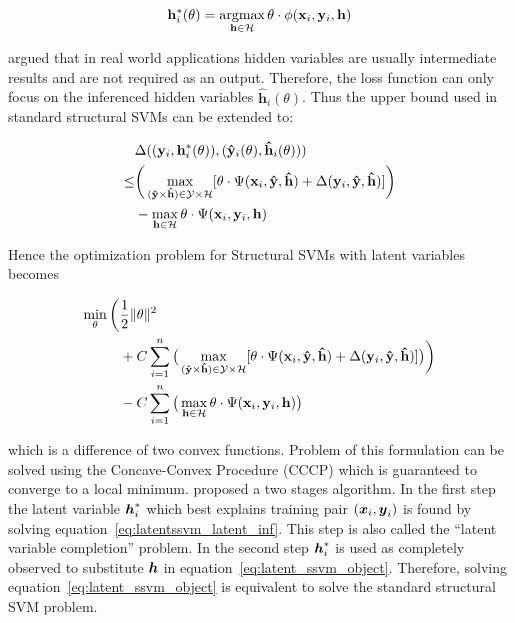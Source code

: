 \documentclass[sigconf, anonymous, review]{acmart}
\renewcommand{\citename}{\citet}
\renewcommand{\cite}{\citep}
\begin{document}
\begin{align}
  \label{eq:latentssvm_latent_inf}
  \mathbf{h}^*_i(\theta) = \mathop{\textrm{argmax}}_{\mathbf{h} \in \mathcal{H}} \theta \cdot
  \phi(\mathbf{x}_i,\mathbf{y}_i,\mathbf{h})
\end{align}

\citename{yu2009learning} argued that in real world applications
hidden variables are usually intermediate results and are not
required as an output\cite{yu2009learning}. Therefore, the loss
function can only focus on the inferenced hidden variables
$\mathbf{\hat{h}}_i(\theta)$. Thus the upper bound used in
standard structural SVMs\cite{tsochantaridis2005large} can be
extended to:

\begin{align}
  &\Delta((\mathbf{y}_i,\mathbf{h}^*_i(\theta)),(\mathbf{\hat{y}}_i(\theta),\mathbf{\hat{h}}_i(\theta)))\notag\\
  \leq&
    \bigg(\max_{(\mathbf{\hat{y}} \times \mathbf{\hat{h}}) \in
    \mathcal{Y} \times \mathcal{H}}
    [\theta\cdot\Psi(\mathbf{x}_i,\mathbf{\hat{y}},\mathbf{\hat{h}})
  +\Delta(\mathbf{y}_i,\mathbf{\hat{y}},\mathbf{\hat{h}})]\bigg)\notag\\
  &-\max_{\mathbf{h} \in \mathcal{H}} \theta \cdot
    \Psi(\mathbf{x}_i,\mathbf{y}_i,\mathbf{h})
\end{align}

Hence the optimization problem for Structural SVMs with latent
variables becomes

\begin{align}
\label{eq:latent_ssvm_object}
  \min_\theta\bigg(&\frac{1}{2}\|\theta\|^2 \notag \\
  & + C\sum_{i=1}^{n}\big(\max_{(\mathbf{\hat{y}} \times
  \mathbf{\hat{h}}) \in \mathcal{Y} \times \mathcal{H}}
  [\theta\cdot\Psi(\mathbf{x}_i,\mathbf{\hat{y}},\mathbf{\hat{h}}) +
  \Delta(\mathbf{y}_i,\mathbf{\hat{y}},\mathbf{\hat{h}})]\big)\bigg)\notag \\
  & -C\sum_{i=1}^{n}\big(\max_{\mathbf{h} \in \mathcal{H}} \theta \cdot
  \Psi(\mathbf{x}_i,\mathbf{y}_i,\mathbf{h})\big)
\end{align}

\noindent which is a difference of two convex functions. Problem
of this formulation can be solved using the Concave-Convex
Procedure (CCCP)\cite{yuille2002concave} which is guaranteed to
converge to a local minimum. \citename{yu2009learning} proposed a
two stages algorithm. In the first step the latent variable
${\boldsymbol{h}}_i^*$ which best explains training pair $({\boldsymbol{x}}_i, {\boldsymbol{y}}_i)$ is
found by solving equation~\eqref{eq:latentssvm_latent_inf}. This
step is also called the ``latent variable completion'' problem.
In the second step ${\boldsymbol{h}}_i^*$ is used as completely observed to
substitute ${\boldsymbol{h}}$ in equation~\eqref{eq:latent_ssvm_object}.
Therefore, solving equation~\eqref{eq:latent_ssvm_object} is
equivalent to solve the standard structural SVM problem.
\end{document}

